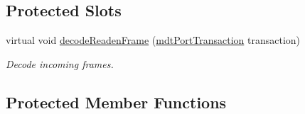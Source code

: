 \subsection*{Protected Slots}
\begin{DoxyCompactItemize}
\item 
virtual void \hyperlink{classmdt_device_a5556423c2e2b3a3adcca5d4efb5af04e}{decodeReadenFrame} (\hyperlink{classmdt_port_transaction}{mdtPortTransaction} transaction)
\begin{DoxyCompactList}\small\item\em Decode incoming frames. \end{DoxyCompactList}\end{DoxyCompactItemize}
\subsection*{Protected Member Functions}
